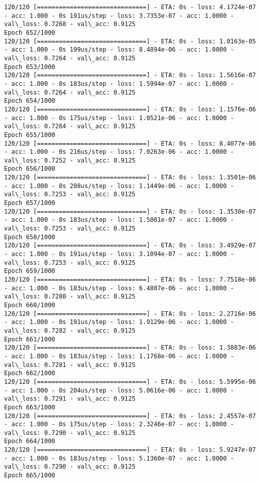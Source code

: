\documentclass[11pt]{article}
\begin{document}
\begin{Verbatim}[commandchars=\\\{\}]
120/120 [==============================] - ETA: 0s - loss: 4.1724e-07 - acc: 1.000 - 0s 191us/step - loss: 3.7353e-07 - acc: 1.0000 - val\_loss: 0.7268 - val\_acc: 0.9125
Epoch 652/1000
120/120 [==============================] - ETA: 0s - loss: 1.0163e-05 - acc: 1.000 - 0s 199us/step - loss: 8.4894e-06 - acc: 1.0000 - val\_loss: 0.7264 - val\_acc: 0.9125
Epoch 653/1000
120/120 [==============================] - ETA: 0s - loss: 1.5616e-07 - acc: 1.000 - 0s 183us/step - loss: 1.5994e-07 - acc: 1.0000 - val\_loss: 0.7264 - val\_acc: 0.9125
Epoch 654/1000
120/120 [==============================] - ETA: 0s - loss: 1.1576e-06 - acc: 1.000 - 0s 175us/step - loss: 1.0521e-06 - acc: 1.0000 - val\_loss: 0.7264 - val\_acc: 0.9125
Epoch 655/1000
120/120 [==============================] - ETA: 0s - loss: 8.4077e-06 - acc: 1.000 - 0s 216us/step - loss: 7.0263e-06 - acc: 1.0000 - val\_loss: 0.7252 - val\_acc: 0.9125
Epoch 656/1000
120/120 [==============================] - ETA: 0s - loss: 1.3501e-06 - acc: 1.000 - 0s 208us/step - loss: 1.1449e-06 - acc: 1.0000 - val\_loss: 0.7253 - val\_acc: 0.9125
Epoch 657/1000
120/120 [==============================] - ETA: 0s - loss: 1.3530e-07 - acc: 1.000 - 0s 183us/step - loss: 1.5001e-07 - acc: 1.0000 - val\_loss: 0.7253 - val\_acc: 0.9125
Epoch 658/1000
120/120 [==============================] - ETA: 0s - loss: 3.4929e-07 - acc: 1.000 - 0s 191us/step - loss: 3.1094e-07 - acc: 1.0000 - val\_loss: 0.7253 - val\_acc: 0.9125
Epoch 659/1000
120/120 [==============================] - ETA: 0s - loss: 7.7518e-06 - acc: 1.000 - 0s 183us/step - loss: 6.4807e-06 - acc: 1.0000 - val\_loss: 0.7280 - val\_acc: 0.9125
Epoch 660/1000
120/120 [==============================] - ETA: 0s - loss: 2.2716e-06 - acc: 1.000 - 0s 191us/step - loss: 1.9129e-06 - acc: 1.0000 - val\_loss: 0.7282 - val\_acc: 0.9125
Epoch 661/1000
120/120 [==============================] - ETA: 0s - loss: 1.3883e-06 - acc: 1.000 - 0s 183us/step - loss: 1.1768e-06 - acc: 1.0000 - val\_loss: 0.7281 - val\_acc: 0.9125
Epoch 662/1000
120/120 [==============================] - ETA: 0s - loss: 5.5995e-06 - acc: 1.000 - 0s 204us/step - loss: 5.0616e-06 - acc: 1.0000 - val\_loss: 0.7291 - val\_acc: 0.9125
Epoch 663/1000
120/120 [==============================] - ETA: 0s - loss: 2.4557e-07 - acc: 1.000 - 0s 175us/step - loss: 2.3246e-07 - acc: 1.0000 - val\_loss: 0.7290 - val\_acc: 0.9125
Epoch 664/1000
120/120 [==============================] - ETA: 0s - loss: 5.9247e-07 - acc: 1.000 - 0s 183us/step - loss: 5.1360e-07 - acc: 1.0000 - val\_loss: 0.7290 - val\_acc: 0.9125
Epoch 665/1000

\end{Verbatim}
\end{document}
